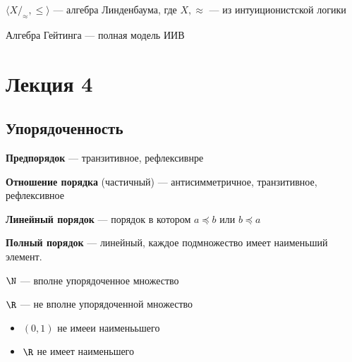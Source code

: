 \documentclass[oneside]{book}
\renewcommand{\leftmark}{}
\begin{document}
\beginproperty
\begin{property}
	\(\langle X/_\approx, \le \rangle\) --- алгебра Линденбаума, где \(X, \approx\) --- из интуиционистской логики
	\label{org10b141d}
\end{property}
\begin{theorem}
	Алгебра Гейтинга --- полная модель ИИВ
	\label{orgc99539e}
\end{theorem}
\chapter*{Лекция 4}\renewcommand{\leftmark}{Лекция 4}
\label{sec:orgd05aa4f}
\renewcommand{\P}{\mathcal{P}}
\newcommand{\A}{\mathcal{A}}
\newcommand{\L}{\mathcal{L}}
\newcommand{\B}{\mathcal{B}}

\section{Упорядоченность}
\label{sec:orgf41d509}
\begin{definition}
	\textbf{Предпорядок} --- транзитивное, рефлексивнре
\end{definition}
\begin{definition}
	\textbf{Отношение порядка} (частичный) --- антисимметричное, транзитивное, рефлексивное
\end{definition}
\begin{definition}
	\textbf{Линейный порядок} --- порядок в котором \(a \preceq b\) или \(b \preceq a\)
\end{definition}
\begin{definition}
	\textbf{Полный порядок} --- линейный, каждое подмножество имеет наименьший элемент.
\end{definition}
\begin{examp}
	\(\N\) --- вполне упорядоченное множество
\end{examp}
\begin{examp}
	\(\R\) --- не вполне упорядоченной множество
	\begin{itemize}
		\item \((0, 1)\) не имееи наименььшего
		\item \(\R\) не имеет наименьшего
	\end{itemize}
\end{examp}
\end{document}

